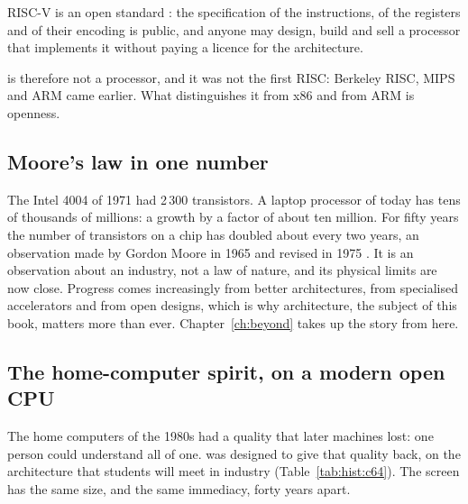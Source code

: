 \begin{definition}{RISC-V}
\riscv is an open standard : the
specification of the instructions, of the registers and of their encoding is
public, and anyone may design, build and sell a processor that implements it
without paying a licence for the architecture.
\end{definition}

\riscv is therefore not a processor, and it was not the first RISC: Berkeley
RISC, MIPS and ARM came earlier. What distinguishes it from x86 and from ARM
is openness.

\subsection{Moore's law in one number}

The Intel 4004 of 1971 had 2\,300 transistors. A laptop processor of today
has tens of thousands of millions: a growth by a factor of about ten million.
For fifty years the number of transistors on a chip has doubled about every
two years, an observation made by Gordon Moore in 1965 and revised in 1975
\citep{moore1965}. It is an observation about an industry, not a law of
nature, and its physical limits are now close. Progress comes increasingly
from better architectures, from specialised accelerators and from open
designs, which is why architecture, the subject of this book, matters more
than ever. Chapter~\ref{ch:beyond} takes up the story from here.

\subsection{The home-computer spirit, on a modern open CPU}

The home computers of the 1980s had a quality that later machines lost: one
person could understand all of one. \prg was designed to give that quality
back, on the architecture that students will meet in industry
(Table~\ref{tab:hist:c64}). The screen has the same size, and the same
immediacy, forty years apart.

